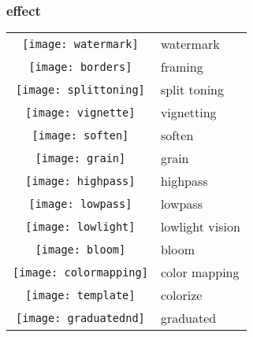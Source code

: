 \documentclass[\ArgLang,\ArgFormat,9pt]{extarticle}
\begin{document}
\begin{multicols}{3}
  \subsubsection{effect}

  \colorbox{keycol}{%
    \begin{tabularx}{\tabwidth}{cl} 
      \texttt{[image: watermark]} & watermark \\
      \texttt{[image: borders]} & framing \\
      \texttt{[image: splittoning]} & split toning \\
      \texttt{[image: vignette]} & vignetting \\
      \texttt{[image: soften]} & soften \\
      \texttt{[image: grain]} & grain \\
      \texttt{[image: highpass]} & highpass \\
      \texttt{[image: lowpass]} & lowpass \\
      \texttt{[image: lowlight]} & lowlight vision \\
      \texttt{[image: bloom]} & bloom \\
      \texttt{[image: colormapping]} & color mapping \\
      \texttt{[image: template]} & colorize \\
      \texttt{[image: graduatednd]} & graduated \\
    \end{tabularx}}

\end{multicols}
\end{document}
